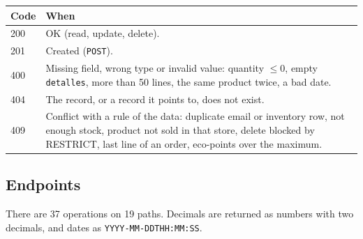 \documentclass[11pt]{article}
\renewcommand{\_}{\oldus\allowbreak}
\begin{document}
\begin{center}
\small
\begin{tabular}{p{1.6cm} >{\raggedright\arraybackslash}p{13cm}}
\toprule
\textbf{Code} & \textbf{When} \\
\midrule
200 & OK (read, update, delete). \\
201 & Created (\texttt{POST}). \\
400 & Missing field, wrong type or invalid value: quantity $\leq 0$, empty \texttt{detalles}, more than 50 lines, the same product twice, a bad date. \\
404 & The record, or a record it points to, does not exist. \\
409 & Conflict with a rule of the data: duplicate email or inventory row, not enough stock, product not sold in that store, delete blocked by RESTRICT, last line of an order, eco-points over the maximum. \\
\bottomrule
\end{tabular}
\end{center}

\subsection{Endpoints}

There are 37 operations on 19 paths. Decimals are returned as numbers with two decimals, and dates
as \texttt{YYYY-MM-DDTHH:MM:SS}.
\end{document}
